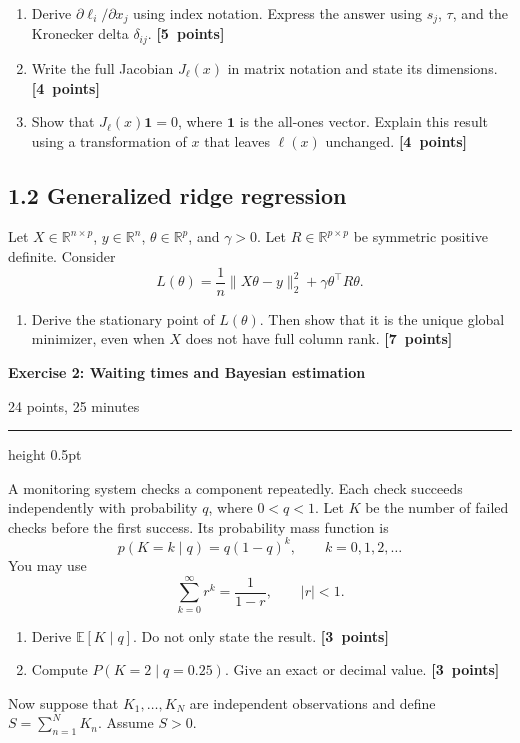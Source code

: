 \documentclass[11pt,a4paper]{article}
\newcommand{\points}[1]{\unskip\nobreak\hfill\mbox{\textbf{[#1 points]}}}
\newcommand{\exercise}[3]{%
  \Needspace{8\baselineskip}%
  \par\addvspace{1.1em}%
  \noindent
  \begin{minipage}[t]{0.73\textwidth}
    \vspace{0pt}\raggedright\large\bfseries\color{examblue}
    Exercise #1: #2
  \end{minipage}\hfill
  \begin{minipage}[t]{0.24\textwidth}
    \vspace{0pt}\raggedleft\small\color{examblue}#3
  \end{minipage}%
  \par\nobreak\vspace{0.2em}%
  {\color{rulegray}\hrule height 0.5pt}%
  \vspace{0.55em}%
}
\begin{document}
\begin{enumerate}
  \item Derive $\partial \ell_i/\partial x_j$ using index notation. Express the answer using $s_j$, $\tau$, and the Kronecker delta $\delta_{ij}$. \points{5}
  \item Write the full Jacobian $J_{\ell}(x)$ in matrix notation and state its dimensions. \points{4}
  \item Show that $J_{\ell}(x)\mathbf{1}=0$, where $\mathbf{1}$ is the all-ones vector. Explain this result using a transformation of $x$ that leaves $\ell(x)$ unchanged. \points{4}
\end{enumerate}

\subsection*{1.2 Generalized ridge regression}

Let $X\in\mathbb{R}^{n\times p}$, $y\in\mathbb{R}^n$, $\theta\in\mathbb{R}^p$, and $\gamma>0$. Let $R\in\mathbb{R}^{p\times p}$ be symmetric positive definite. Consider
\[
  L(\theta)=\frac{1}{n}\lVert X\theta-y\rVert_2^2+\gamma\theta^\top R\theta.
\]

\begin{enumerate}[resume]
  \item Derive the stationary point of $L(\theta)$. Then show that it is the unique global minimizer, even when $X$ does not have full column rank. \points{7}
\end{enumerate}

\exercise{2}{Waiting times and Bayesian estimation}{24 points, 25 minutes}

A monitoring system checks a component repeatedly. Each check succeeds independently with probability $q$, where $0<q<1$. Let $K$ be the number of failed checks before the first success. Its probability mass function is
\[
  p(K=k\mid q)=q(1-q)^k,\qquad k=0,1,2,\ldots
\]
You may use
\[
  \sum_{k=0}^{\infty}r^k=\frac{1}{1-r},\qquad |r|<1.
\]

\begin{enumerate}
  \item Derive $\mathbb{E}[K\mid q]$. Do not only state the result. \points{3}
  \item Compute $P(K=2\mid q=0.25)$. Give an exact or decimal value. \points{3}
\end{enumerate}

Now suppose that $K_1,\ldots,K_N$ are independent observations and define $S=\sum_{n=1}^{N}K_n$. Assume $S>0$.
\end{document}
